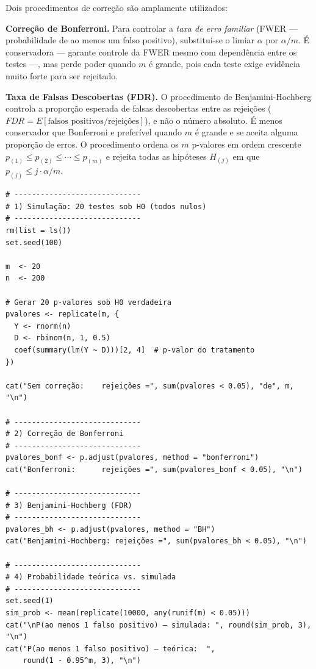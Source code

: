 Dois procedimentos de correção são amplamente utilizados:

\medskip
\noindent\textbf{Correção de Bonferroni.} Para controlar a \textit{taxa de erro familiar} (FWER — probabilidade de ao menos um falso positivo), substitui-se o limiar $\alpha$ por $\alpha/m$. É conservadora — garante controle da FWER mesmo com dependência entre os testes —, mas perde poder quando $m$ é grande, pois cada teste exige evidência muito forte para ser rejeitado.

\medskip
\noindent\textbf{Taxa de Falsas Descobertas (FDR).} O procedimento de Benjamini-Hochberg \citep{BenjaminiHochberg1995} controla a proporção esperada de falsas descobertas entre as rejeições ($FDR = E[\text{falsos positivos}/\text{rejeições}]$), e não o número absoluto. É menos conservador que Bonferroni e preferível quando $m$ é grande e se aceita alguma proporção de erros. O procedimento ordena os $m$ p-valores em ordem crescente $p_{(1)} \leq p_{(2)} \leq \cdots \leq p_{(m)}$ e rejeita todas as hipóteses $H_{(j)}$ em que $p_{(j)} \leq j \cdot \alpha / m$.

\begin{lstlisting}[style=Rstyle, caption={Correção para múltiplos testes em R}]
# -----------------------------
# 1) Simulação: 20 testes sob H0 (todos nulos)
# -----------------------------
rm(list = ls())
set.seed(100)

m  <- 20
n  <- 200

# Gerar 20 p-valores sob H0 verdadeira
pvalores <- replicate(m, {
  Y <- rnorm(n)
  D <- rbinom(n, 1, 0.5)
  coef(summary(lm(Y ~ D)))[2, 4]  # p-valor do tratamento
})

cat("Sem correção:    rejeições =", sum(pvalores < 0.05), "de", m, "\n")

# -----------------------------
# 2) Correção de Bonferroni
# -----------------------------
pvalores_bonf <- p.adjust(pvalores, method = "bonferroni")
cat("Bonferroni:      rejeições =", sum(pvalores_bonf < 0.05), "\n")

# -----------------------------
# 3) Benjamini-Hochberg (FDR)
# -----------------------------
pvalores_bh <- p.adjust(pvalores, method = "BH")
cat("Benjamini-Hochberg: rejeições =", sum(pvalores_bh < 0.05), "\n")

# -----------------------------
# 4) Probabilidade teórica vs. simulada
# -----------------------------
set.seed(1)
sim_prob <- mean(replicate(10000, any(runif(m) < 0.05)))
cat("\nP(ao menos 1 falso positivo) — simulada: ", round(sim_prob, 3), "\n")
cat("P(ao menos 1 falso positivo) — teórica:  ",
    round(1 - 0.95^m, 3), "\n")
\end{lstlisting}

